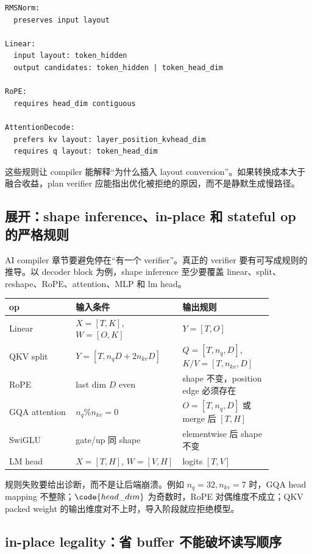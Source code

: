 \begin{lstlisting}[numbers=none,caption={layout propagation 的规则形态}]
RMSNorm:
  preserves input layout

Linear:
  input layout: token_hidden
  output candidates: token_hidden | token_head_dim

RoPE:
  requires head_dim contiguous

AttentionDecode:
  prefers kv layout: layer_position_kvhead_dim
  requires q layout: token_head_dim
\end{lstlisting}

这些规则让 compiler 能解释“为什么插入 layout conversion”。如果转换成本大于融合收益，plan verifier 应能指出优化被拒绝的原因，而不是静默生成慢路径。

\subsection{展开：shape inference、in-place 和 stateful op 的严格规则}

AI compiler 章节要避免停在“有一个 verifier”。真正的 verifier 要有可写成规则的推导。以 decoder block 为例，shape inference 至少要覆盖 linear、split、reshape、RoPE、attention、MLP 和 lm head。

\begin{center}
\begin{tabular}{p{0.22\linewidth}p{0.34\linewidth}p{0.30\linewidth}}
\toprule
op & 输入条件 & 输出规则 \\
\midrule
Linear & \(X=[T,K]\), \(W=[O,K]\) & \(Y=[T,O]\) \\
QKV split & \(Y=[T,n_qD+2n_{kv}D]\) & \(Q=[T,n_q,D]\), \(K/V=[T,n_{kv},D]\) \\
RoPE & last dim \(D\) even & shape 不变，position edge 必须存在 \\
GQA attention & \(n_q \% n_{kv}=0\) & \(O=[T,n_q,D]\) 或 merge 后 \([T,H]\) \\
SwiGLU & gate/up 同 shape & elementwise 后 shape 不变 \\
LM head & \(X=[T,H]\), \(W=[V,H]\) & logits \([T,V]\) \\
\bottomrule
\end{tabular}
\end{center}

规则失败要给出诊断，而不是让后端崩溃。例如 \(n_q=32,n_{kv}=7\) 时，GQA head mapping 不整除；\(\code{head\_dim}\) 为奇数时，RoPE 对偶维度不成立；QKV packed weight 的输出维度对不上时，导入阶段就应拒绝模型。

\subsection{in-place legality：省 buffer 不能破坏读写顺序}

